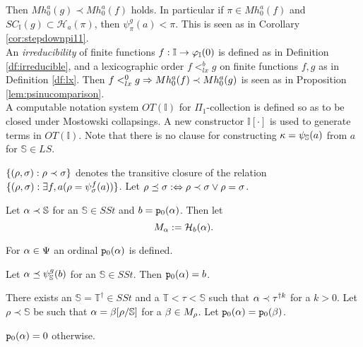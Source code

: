 \documentclass{article}
\newcommand{\mS}{\mathbb{S}}
\newcommand{\mI}{\mathbb{I}}
\newcommand{\mT}{\mathbb{T}}
\begin{document}
Then
$Mh^{a}_{0}(g)\prec Mh^{a}_{0}(f)$ holds.
In particular if $\pi\in Mh^{a}_{0}(f)$ and
$SC_{\mI}(g)\subset\mathcal{H}_{a}(\pi)$, then
$\psi_{\pi}^{g}(a)<\pi$.
\ecor
\bprf
This is seen as in Corollary \ref{cor:stepdownpi11}.
\eprf
\\


An \textit{irreducibility} of finite functions $f:\mI\to\vphi_{\mI}(0)$ is defined as in Definition \ref{df:irreducible},
and a lexicographic order $f<^{b}_{lx}g$ on finite functions $f,g$ as in Definition \ref{df:lx}.
Then $f<^{0}_{lx}g \Rightarrow Mh^{a}_{0}(f)\prec Mh^{a}_{0}(g)$ is seen 
as in Proposition \ref{lem:psinucomparison}.
\\


A computable notation system $OT(\mI)$ for $\Pi_{1}$-collection
is defined so as to be closed under 
Mostowski collapsings.
A new constructor $\mI[\cdot]$ is used to generate terms in $OT(\mI)$.
Note that 
there is no clause for constructing $\kap=\psi_{\mS}(a)$ from $a$
for $\mS\in LS$.









\bdf\label{df:prec}
{\rm
\benu
\item
$\{(\rho,\sigma): \rho\prec\sigma\}$ denotes the transitive closure 
of the relation $\{(\rho,\sigma): \exists f,a(\rho=\psi_{\sigma}^{f}(a))\}$.
Let $\rho\preceq\sigma:\Leftrightarrow \rho\prec\sigma \lor \rho=\sigma$.

\item
Let $\alp\prec\mS$ for an $\mS\in SSt$ and $b={\tt p}_{0}(\alpha)$.
Then let
\[
M_{\alpha}  :=  \mathcal{H}_{b}(\alpha)
.\]

\item
For $\alpha\in\Psi$ an ordinal ${\tt p}_{0}(\alpha)$ is defined.

\benu
\item
Let $\alp\preceq\psi_{\mS}^{g}(b)$ for an $\mS\in SSt$. 
Then ${\tt p}_{0}(\alpha)=b$.

\item
There exists an $\mS=\mT^{\dagger}\in SSt$ and a $\mT<\tau<\mS$ such that
$\alpha\prec\tau^{\dagger k}$ for a $k>0$.
Let $\rho\prec\mS$ be such that $\alp=\bet[\rho/\mS]$ for a 
$\beta\in M_{\rho}$.
Let 
${\tt p}_{0}(\alpha)={\tt p}_{0}(\beta)$.

\item
${\tt p}_{0}(\alpha)=0$ otherwise.
\eenu


\eenu
}
\edf
\end{document}

